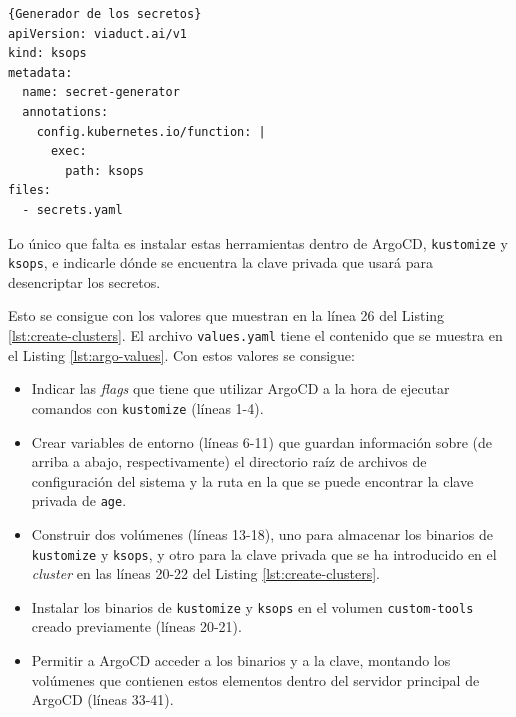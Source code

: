 \begin{itemize}
\begin{lstlisting}[language=helm,label=lst:generator]{Generador de los secretos}
apiVersion: viaduct.ai/v1
kind: ksops
metadata:
  name: secret-generator
  annotations:
    config.kubernetes.io/function: |
      exec:
        path: ksops
files:
  - secrets.yaml
\end{lstlisting}

\end{itemize}

Lo único que falta es instalar estas herramientas dentro de ArgoCD, \texttt{kustomize} y \texttt{ksops}, e indicarle dónde se encuentra la clave privada que usará para desencriptar los secretos.

Esto se consigue con los valores que muestran en la línea 26 del Listing \ref{lst:create-clusters}. El archivo \texttt{values.yaml} tiene el contenido que se muestra en el Listing \ref{lst:argo-values}. Con estos valores se consigue:

\begin{itemize}
  \item Indicar las \textit{flags} que tiene que utilizar ArgoCD a la hora de ejecutar comandos con \texttt{kustomize} (líneas 1-4).
  \item Crear variables de entorno (líneas 6-11) que guardan información sobre (de arriba a abajo, respectivamente) el directorio raíz de archivos de configuración del sistema y la ruta en la que se puede encontrar la clave privada de \texttt{age}.
  \item Construir dos volúmenes (líneas 13-18), uno para almacenar los binarios de \texttt{kustomize} y \texttt{ksops}, y otro para la clave privada que se ha introducido en el \textit{cluster} en las líneas 20-22 del Listing \ref{lst:create-clusters}.
  \item Instalar los binarios de \texttt{kustomize} y \texttt{ksops} en el volumen \texttt{custom-tools} creado previamente (líneas 20-21).
  \item Permitir a ArgoCD acceder a los binarios y a la clave, montando los volúmenes que contienen estos elementos dentro del servidor principal de ArgoCD (líneas 33-41).
\end{itemize}

